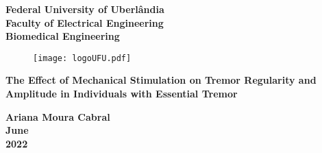 \thispagestyle{empty}

\begin{center}

\textbf{\Large{Federal University of Uberlândia}} \\
\textbf{\Large{Faculty of Electrical Engineering}} \\
\textbf{\Large{Biomedical Engineering}}\\

\vspace{1.5cm}

\begin{figure}[h]
\vspace{40pt}
\begin{center}
{\texttt{[image: logoUFU.pdf]}}
\end{center}
\end{figure}

\vspace{1.5cm}

\begingroup
\DoubleSpacing
\begin{center}
\textbf{\Huge The Effect of Mechanical Stimulation on Tremor Regularity and Amplitude in Individuals with Essential Tremor}
\end{center}
\endgroup

\vspace{3.5cm}
\textbf{\Large{Ariana Moura Cabral}} \\
\vspace{3.5cm}
\textbf{\large{June}} \\
\textbf{\large{2022}}\\

\end{center}

\clearpage